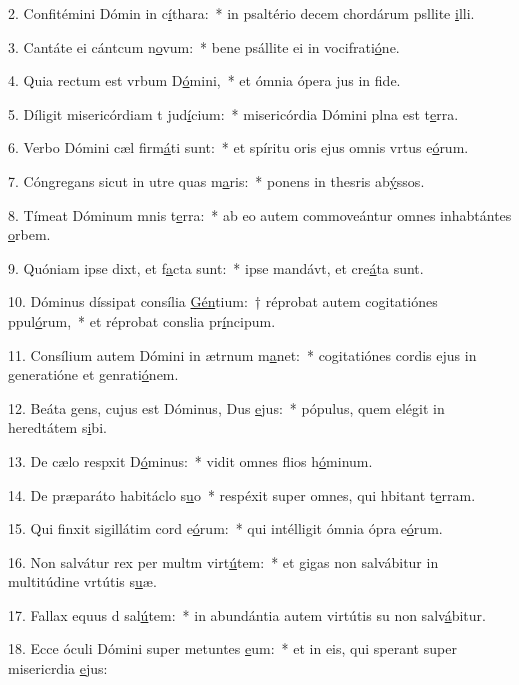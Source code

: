 2. Confitémini Dómin in c\uline{í}thara:~* in psaltério decem chordárum psllite \uline{i}lli.\par 
3. Cantáte ei cántcum n\uline{o}vum:~* bene psállite ei in vocifrati\uline{ó}ne.\par 
4. Quia rectum est vrbum D\uline{ó}mini,~* et ómnia ópera jus in f\uline{i}de.\par 
5. Díligit misericórdiam t jud\uline{í}cium:~* misericórdia Dómini plna est t\uline{e}rra.\par 
6. Verbo Dómini cæl firm\uline{á}ti sunt:~* et spíritu oris ejus omnis vrtus e\uline{ó}rum.\par 
7. Cóngregans sicut in utre quas m\uline{a}ris:~* ponens in thesris ab\uline{ý}ssos.\par 
8. Tímeat Dóminum mnis t\uline{e}rra:~* ab eo autem commoveántur omnes inhabtántes \uline{o}rbem.\par 
9. Quóniam ipse dixt, et f\uline{a}cta sunt:~* ipse mandávt, et cre\uline{á}ta sunt.\par 
10. Dóminus díssipat consília \uline{Gén}tium:~† réprobat autem cogitatiónes ppul\uline{ó}rum,~* et réprobat conslia pr\uline{í}ncipum.\par 
11. Consílium autem Dómini in ætrnum m\uline{a}net:~* cogitatiónes cordis ejus in generatióne et genrati\uline{ó}nem.\par 
12. Beáta gens, cujus est Dóminus, Dus \uline{e}jus:~* pópulus, quem elégit in heredtátem s\uline{i}bi.\par 
13. De cælo respxit D\uline{ó}minus:~* vidit omnes flios h\uline{ó}minum.\par 
14. De præparáto habitáclo s\uline{u}o~* respéxit super omnes, qui hbitant t\uline{e}rram.\par 
15. Qui finxit sigillátim cord e\uline{ó}rum:~* qui intélligit ómnia ópra e\uline{ó}rum.\par 
16. Non salvátur rex per multm virt\uline{ú}tem:~* et gigas non salvábitur in multitúdine vrtútis s\uline{u}æ.\par 
17. Fallax equus d sal\uline{ú}tem:~* in abundántia autem virtútis su non salv\uline{á}bitur.\par 
18. Ecce óculi Dómini super metuntes \uline{e}um:~* et in eis, qui sperant super misericrdia \uline{e}jus:\par 
